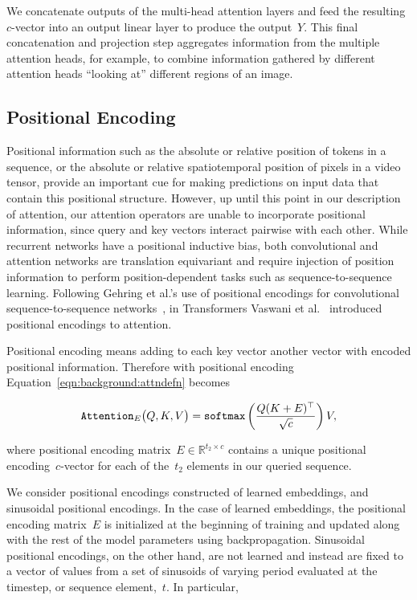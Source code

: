 We concatenate outputs of the multi-head attention layers and feed the
resulting~$c$-vector into an output linear layer to produce the output~$Y$.
This final concatenation and projection step aggregates information from the
multiple attention heads, for example, to combine information gathered by
different attention heads ``looking at'' different regions of an image.


\subsection{Positional Encoding}

Positional information such as the absolute or relative position of tokens in a
sequence, or the absolute or relative spatiotemporal position of pixels in a
video tensor, provide an important cue for making predictions on input data
that contain this positional structure.
However, up until this point in our description of attention, our attention
operators are unable to incorporate positional information, since query and key
vectors interact pairwise with each other.
While recurrent networks have a positional inductive bias, both convolutional
and attention networks are translation equivariant and require injection of
position information to perform position-dependent tasks such as
sequence-to-sequence learning.
Following Gehring et al.'s use of positional encodings for convolutional
sequence-to-sequence networks~\cite{gehring2017convolutional}, in Transformers
Vaswani et al.~\cite{vaswani2017attention} introduced positional encodings to
attention.

Positional encoding means adding to each key vector another vector with encoded
positional information.
Therefore with positional encoding Equation~\ref{eqn:background:attndefn} becomes

\begin{equation}
\mathtt{Attention}_E\big(Q, K, V\big) = \mathtt{softmax}{}\left(\frac{Q(K + E)^\top}{\sqrt{c}}\right) V,
\label{eqn:background:posenc-attn}
\end{equation}

\noindent where positional encoding matrix~$E \in \mathbb{R}^{t_2\times c}$ contains a
unique positional encoding~$c$-vector for each of the~$t_2$ elements in our
queried sequence.

We consider positional encodings constructed of learned embeddings, and sinusoidal
positional encodings.
In the case of learned embeddings, the positional encoding matrix~$E$ is
initialized at the beginning of training and updated along with the rest of the
model parameters using backpropagation.
Sinusoidal positional encodings, on the other hand, are not learned and instead
are fixed to a vector of values from a set of sinusoids of varying period
evaluated at the timestep, or sequence element,~$t$.
In particular,

